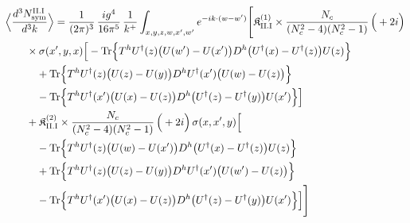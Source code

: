 \begingroup\small
\begin{align}\label{eq:S-II.I-3}
&\Big\langle\frac{d^{3}N^{\rm II.I}_{{\rm sym}}}{d^{3}k}\Big\rangle=\frac{1}{(2\pi)^{3}}\, \frac{ig^{4}}{16\pi^{5}}\, \frac{1}{k^{+}} \int_{x,y,z,w,x',w'}e^{-ik\cdot(w-w')}\Bigg[ \mathfrak{K}^{(1)}_{\rm II.I} \times \frac{N_{c}}{(N_{c}^{2}-4)(N_{c}^{2}-1)}\, \Big(+2i\Big)\notag\\
&\quad\quad \times \sigma(x',y,x)\Big[ -{\rm Tr}\Big\{T^{h}U^{\dagger}(z)\big(U(w')-U(x')\big)D^{h}\big(U^{\dagger}(x)-U^{\dagger}(z)\big)U(z)\Big\}\notag\\
&\quad\quad\quad +{\rm Tr}\Big\{T^{h}U^{\dagger}(z)\big(U(z)-U(y)\big)D^{h}U^{\dagger}(x')\big(U(w)-U(z)\big)\Big\}\notag\\
&\quad\quad\quad -{\rm Tr}\Big\{T^{h}U^{\dagger}(x')\big(U(x)-U(z)\big)D^{h}\big(U^{\dagger}(z)-U^{\dagger}(y)\big)U(x')\Big\}\Big]\notag\\
&\quad\quad + \mathfrak{K}^{(2)}_{\rm II.I} \times \frac{N_{c}}{(N_{c}^{2}-4)(N_{c}^{2}-1)}\, \Big(+2i\Big)\, \sigma(x,x',y)\Big[\notag\\
&\quad\quad\quad -{\rm Tr}\Big\{T^{h}U^{\dagger}(z)\big(U(w)-U(x')\big)D^{h}\big(U^{\dagger}(x)-U^{\dagger}(z)\big)U(z)\Big\}\notag\\
&\quad\quad\quad +{\rm Tr}\Big\{T^{h}U^{\dagger}(z)\big(U(z)-U(y)\big)D^{h}U^{\dagger}(x')\big(U(w')-U(z)\big)\Big\}\notag\\
&\quad\quad\quad -{\rm Tr}\Big\{T^{h}U^{\dagger}(x')\big(U(x)-U(z)\big)D^{h}\big(U^{\dagger}(z)-U^{\dagger}(y)\big)U(x')\Big\}\Big]\Bigg]
\end{align}
\endgroup
